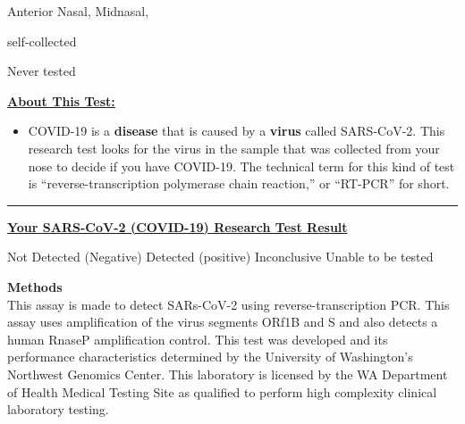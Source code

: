 \documentclass[10pt]{article}
\newcommand{\PageLine}{\rule{\textwidth}{0.25mm}}
\begin{document}
\begin{description}[font=\normalfont,align=left,labelwidth=12em]
\item [\textbf{Patient Name}] 
\item [\textbf{Date of Birth}] 
\item [\textbf{Ordering Physician}] 
\item [\textbf{Specimen}]
  Anterior Nasal,
  Midnasal,

  self-collected

\item [\textbf{Collection Barcode}] 
\item [\textbf{Collection Date}] 
\item [\textbf{Report Date}]
  Never tested
\end{description}

\bigskip

\large \underline{\textbf{About This Test:}}

\begin{itemize}
\item

  COVID-19 is a \textbf{disease} that is caused by a \textbf{virus} called
  SARS-CoV-2. This research test looks for the virus in the sample that was
  collected from your nose to decide if you have COVID-19. The technical term
  for this kind of test is “reverse-transcription polymerase chain reaction,” or
  “RT-PCR” for short.

\end{itemize}

\bigskip

\PageLine

\large \underline{\textbf{Your SARS-CoV-2 (COVID-19) Research Test Result}}

Not Detected (Negative)
Detected (positive)
Inconclusive
Unable to be tested

\bigskip

\textbf{Methods}\\
This assay is made to detect SARs-CoV-2 using reverse-transcription PCR. This
assay uses amplification of the virus segments ORf1B and S and also detects a
human RnaseP amplification control. This test was developed and its performance
characteristics determined by the University of Washington’s Northwest Genomics
Center. This laboratory is licensed by the WA Department of Health Medical
Testing Site as qualified to perform high complexity clinical laboratory
testing.
\end{document}
